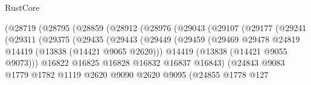 \begin{lexlean}{RustCore}
\begin{coremodule}
                                  (@28719
                                    (@28795
                                      (@28859
                                        (@28912
                                          (@28976
                                            (@29043
                                              (@29107
                                                (@29177
                                                  (@29241
                                                    (@29311
                                                      (@29375
                                                        (@29435
                                                          (@29443
                                                            (@29449
                                                              (@29459
                                                                (@29469
                                                                  @29478
                                                                  @24819
                                                                  @14419
                                                                  (@13838 (@14421 @9065 @2620)))
                                                                @14419
                                                                (@13838 (@14421 @9055 @9073)))
                                                              @16822
                                                              @16825
                                                              @16828
                                                              @16832
                                                              @16837
                                                              @16843)
                                                            (@24843
                                                              @9083
                                                              @1779
                                                              @1782
                                                              @1119
                                                              @2620
                                                              @9090
                                                              @2620
                                                              @9095
                                                              (@24855
                                                                @1778
                                                                @127

\end{coremodule}
\end{lexlean}
